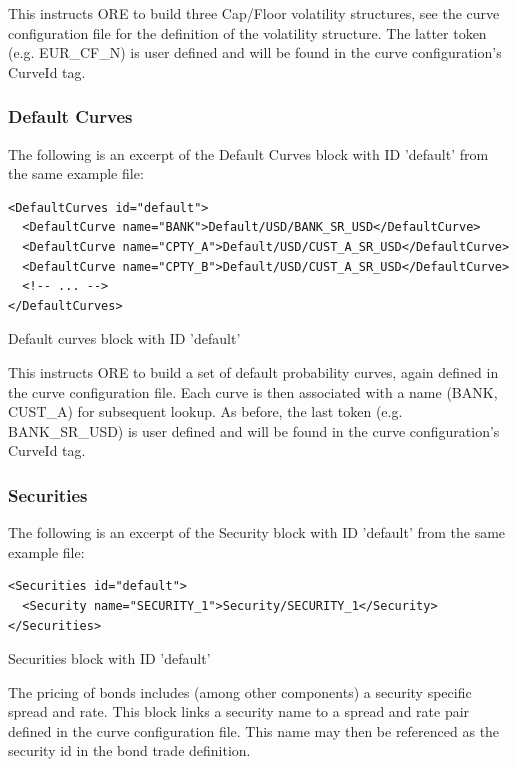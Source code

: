 \documentclass[12pt, a4paper]{article}
\begin{document}
This instructs ORE to build three Cap/Floor volatility structures, see the curve configuration file for the definition
of the volatility structure. The latter token (e.g. EUR\_CF\_N) is user defined and will be found in the curve
configuration's CurveId tag.

\subsubsection{Default Curves}

The following is an excerpt of the Default Curves block with ID 'default' from the same example file:

\begin{listing}[H]
\begin{verbatim}
<DefaultCurves id="default">
  <DefaultCurve name="BANK">Default/USD/BANK_SR_USD</DefaultCurve>
  <DefaultCurve name="CPTY_A">Default/USD/CUST_A_SR_USD</DefaultCurve>
  <DefaultCurve name="CPTY_B">Default/USD/CUST_A_SR_USD</DefaultCurve>
  <!-- ... -->
</DefaultCurves>
\end{verbatim}
\caption{Default curves block with ID 'default'}
\label{lst:defaultcurve_spec}
\end{listing}

This instructs ORE to build a set of default probability curves, again defined in the curve configuration file. Each
curve is then associated with a name (BANK, CUST\_A) for subsequent lookup.  As before, the last token
(e.g. BANK\_SR\_USD) is user defined and will be found in the curve configuration's CurveId tag.

\subsubsection{Securities}\label{sssec:securities}

The following is an excerpt of the Security block with ID 'default' from the same example file:

\begin{listing}[H]
	\begin{verbatim}
<Securities id="default">
  <Security name="SECURITY_1">Security/SECURITY_1</Security>
</Securities>
	\end{verbatim}
	\caption{Securities block with ID 'default'}
	\label{lst:secspread_spec}
\end{listing}

The pricing of bonds includes (among other components) a security specific spread and rate. 
This block links a security name to a spread and rate pair defined in the curve configuration file. This name may then be referenced 
as the security id in the bond trade definition.
\end{document}
